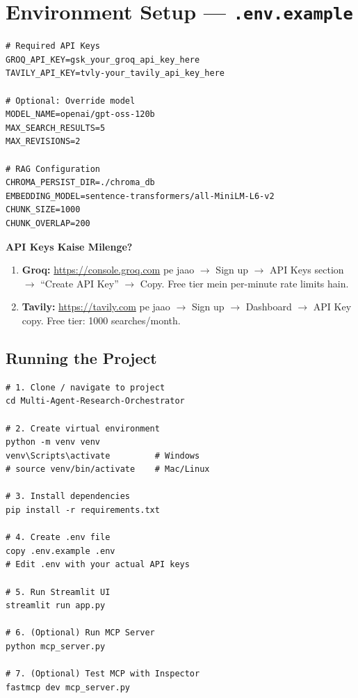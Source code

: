 \documentclass[12pt, a4paper]{article}
\begin{document}
\newpage
\section{Environment Setup --- \texttt{.env.example}}

\begin{lstlisting}[style=envstyle, title={\color{accentgreen}\faIcon{file} .env.example --- Template}]
# Required API Keys
GROQ_API_KEY=gsk_your_groq_api_key_here
TAVILY_API_KEY=tvly-your_tavily_api_key_here

# Optional: Override model
MODEL_NAME=openai/gpt-oss-120b
MAX_SEARCH_RESULTS=5
MAX_REVISIONS=2

# RAG Configuration
CHROMA_PERSIST_DIR=./chroma_db
EMBEDDING_MODEL=sentence-transformers/all-MiniLM-L6-v2
CHUNK_SIZE=1000
CHUNK_OVERLAP=200
\end{lstlisting}

\begin{notebox}
\textbf{API Keys Kaise Milenge?}
\begin{enumerate}
\item \textbf{Groq:} \url{https://console.groq.com} pe jaao $\rightarrow$ Sign up $\rightarrow$ API Keys section $\rightarrow$ ``Create API Key'' $\rightarrow$ Copy. Free tier mein per-minute rate limits hain.
\item \textbf{Tavily:} \url{https://tavily.com} pe jaao $\rightarrow$ Sign up $\rightarrow$ Dashboard $\rightarrow$ API Key copy. Free tier: 1000 searches/month.
\end{enumerate}
\end{notebox}

\subsection{Running the Project}

\begin{lstlisting}[style=bashstyle, title={\color{accentgreen}\faIcon{terminal} Setup Commands}]
# 1. Clone / navigate to project
cd Multi-Agent-Research-Orchestrator

# 2. Create virtual environment
python -m venv venv
venv\Scripts\activate         # Windows
# source venv/bin/activate    # Mac/Linux

# 3. Install dependencies
pip install -r requirements.txt

# 4. Create .env file
copy .env.example .env
# Edit .env with your actual API keys

# 5. Run Streamlit UI
streamlit run app.py

# 6. (Optional) Run MCP Server
python mcp_server.py

# 7. (Optional) Test MCP with Inspector
fastmcp dev mcp_server.py
\end{lstlisting}
\end{document}
